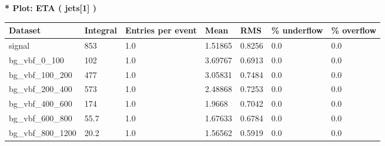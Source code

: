 \documentclass[a4paper, 10pt]{article}
\begin{document}
\textbf{* Plot: ETA ( jets[1] ) }\\
   \begin{table}[H]
  \begin{center}
    \begin{tabular}{|m{23.0mm}|m{23.0mm}|m{18.0mm}|m{19.0mm}|m{19.0mm}|m{19.0mm}|m{19.0mm}|}
      \hline
      {\cellcolor{yellow}         Dataset}& {\cellcolor{yellow}         Integral}& {\cellcolor{yellow}         Entries per event}& {\cellcolor{yellow}         Mean}& {\cellcolor{yellow}         RMS}& {\cellcolor{yellow}         \% underflow}& {\cellcolor{yellow}         \% overflow}\\
      \hline
      {\cellcolor{white}         signal}& {\cellcolor{white}         853}& {\cellcolor{white}         1.0}& {\cellcolor{white}         1.51865}& {\cellcolor{white}         0.8256}& {\cellcolor{green}         0.0}& {\cellcolor{green}         0.0}\\
      \hline
      {\cellcolor{white}         bg\_vbf\_0\_100}& {\cellcolor{white}         102}& {\cellcolor{white}         1.0}& {\cellcolor{white}         3.69767}& {\cellcolor{white}         0.6913}& {\cellcolor{green}         0.0}& {\cellcolor{green}         0.0}\\
      \hline
      {\cellcolor{white}         bg\_vbf\_100\_200}& {\cellcolor{white}         477}& {\cellcolor{white}         1.0}& {\cellcolor{white}         3.05831}& {\cellcolor{white}         0.7484}& {\cellcolor{green}         0.0}& {\cellcolor{green}         0.0}\\
      \hline
      {\cellcolor{white}         bg\_vbf\_200\_400}& {\cellcolor{white}         573}& {\cellcolor{white}         1.0}& {\cellcolor{white}         2.48868}& {\cellcolor{white}         0.7253}& {\cellcolor{green}         0.0}& {\cellcolor{green}         0.0}\\
      \hline
      {\cellcolor{white}         bg\_vbf\_400\_600}& {\cellcolor{white}         174}& {\cellcolor{white}         1.0}& {\cellcolor{white}         1.9668}& {\cellcolor{white}         0.7042}& {\cellcolor{green}         0.0}& {\cellcolor{green}         0.0}\\
      \hline
      {\cellcolor{white}         bg\_vbf\_600\_800}& {\cellcolor{white}         55.7}& {\cellcolor{white}         1.0}& {\cellcolor{white}         1.67633}& {\cellcolor{white}         0.6784}& {\cellcolor{green}         0.0}& {\cellcolor{green}         0.0}\\
      \hline
      {\cellcolor{white}         bg\_vbf\_800\_1200}& {\cellcolor{white}         20.2}& {\cellcolor{white}         1.0}& {\cellcolor{white}         1.56562}& {\cellcolor{white}         0.5919}& {\cellcolor{green}         0.0}& {\cellcolor{green}         0.0}\\

\end{tabular}
\end{center}
\end{table}
\end{document}
